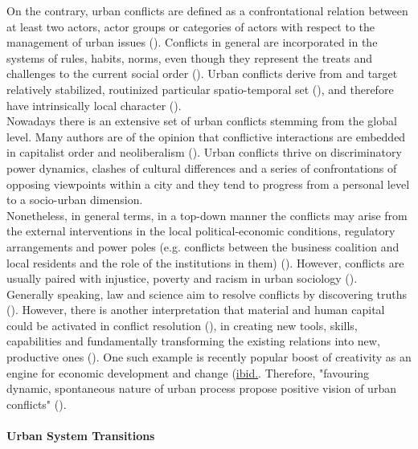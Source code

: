 \documentclass[11pt]{report}
\begin{document}
On the contrary, urban conflicts are defined as a confrontational relation between at least two actors, actor groups or categories of actors with respect to the management of urban issues (\cite{Nel'lo 2003, Aznar et al. 2006. from Renau and Lozano 2016 TerrPolGovern journal}).
Conflicts in general are incorporated in the systems of rules, habits, norms, even though they represent the treats and challenges to the current social order (\cite{Sears and Cairn}).
Urban conflicts derive from and target relatively stabilized, routinized particular spatio-temporal set (\citealt{Brenner and Theodore; Lipietz 1996}), and therefore have intrinsically local character (\citealt{Sassen 2007}).
\\

Nowadays there is an extensive set of urban conflicts stemming from the global level.
Many authors are of the opinion that conflictive interactions are embedded in capitalist order and neoliberalism (\cite{ref Brenner and Theodore, Harvey, conflict authors}).
Urban conflicts thrive on discriminatory power dynamics, clashes of cultural differences and a series of confrontations of opposing viewpoints within a city and they tend to progress from a personal level to a socio-urban dimension.
\\

Nonetheless, in general terms, in a top-down manner the conflicts may arise from the external interventions in the local political-economic conditions, regulatory arrangements and power poles (e.g. conflicts between the business coalition and local residents and the role of the institutions in them) (\cite{Brenner and Theodore}).
However, conflicts are usually paired with injustice, poverty and racism in urban sociology (\cite{Hubbard}).
\\

Generally speaking, law and science aim to resolve conflicts by discovering truths (\cite{Brenner and Theodore}).
However, there is another interpretation that material and human capital could be activated in conflict resolution (\citealt{Coleman 1988}), in creating new tools, skills, capabilities and fundamentally transforming the existing relations into new, productive ones (\citealt{Sears 2008}). One such example is recently popular boost of creativity as an engine for economic development and change (\href{Sears}{ibid.}.
Therefore, "favouring dynamic, spontaneous nature of urban process propose positive vision of urban conflicts" 
(\citealt{Sevilla-Buitrago 2013}).

\paragraph{Urban System Transitions}
\end{document}
